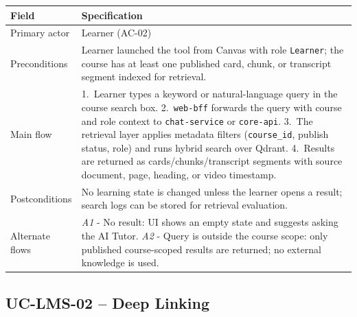 \begin{longtable}{|p{3.2cm}|p{10.3cm}|}
\hline
\textbf{Field} & \textbf{Specification} \\
\hline
\endhead
Primary actor & Learner (AC-02) \\
\hline
Preconditions & Learner launched the tool from Canvas with role
    \texttt{Learner}; the course has at least one published card,
    chunk, or transcript segment indexed for retrieval. \\
\hline
Main flow &
    1.\ Learner types a keyword or natural-language query in the
    course search box.
    2.\ \texttt{web-bff} forwards the query with course and role
    context to \texttt{chat-service} or \texttt{core-api}.
    3.\ The retrieval layer applies metadata filters
    (\texttt{course\_id}, publish status, role) and runs hybrid search
    over Qdrant.
    4.\ Results are returned as cards/chunks/transcript segments with
    source document, page, heading, or video timestamp. \\
\hline
Postconditions & No learning state is changed unless the learner opens
    a result; search logs can be stored for retrieval evaluation. \\
\hline
Alternate flows &
    \emph{A1} - No result: UI shows an empty state and suggests asking
    the AI Tutor.
    \emph{A2} - Query is outside the course scope: only published
    course-scoped results are returned; no external knowledge is used. \\
\hline
\end{longtable}

\subsection{UC-LMS-02 -- Deep Linking}


